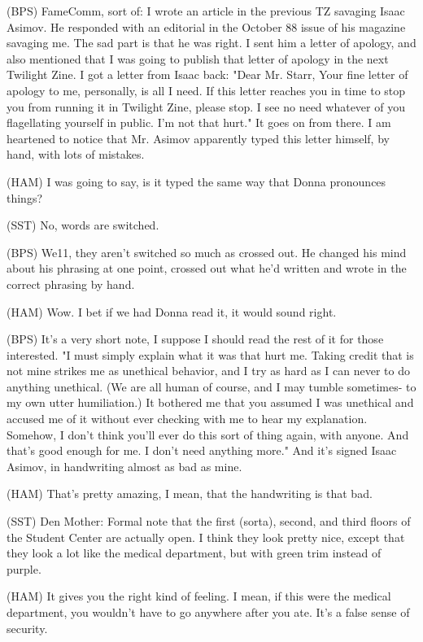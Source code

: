 \documentclass[12pt]{article}
\begin{document}
(BPS) FameComm, sort of: I wrote an article in the previous TZ savaging Isaac Asimov. He responded with an editorial in the October 88 issue of his magazine savaging me. The sad part is that he was right. I sent him a letter of apology, and also mentioned that I was going to publish that letter of apology in the next Twilight Zine. I got a letter from Isaac back: "Dear Mr. Starr, Your fine letter of apology to me, personally, is all I need. If this letter reaches you in time to stop you from running it in Twilight Zine, please stop. I see no need whatever of you flagellating yourself in public. I'm not that hurt." It goes on from there. I am heartened to notice that Mr. Asimov apparently typed this letter himself, by hand, with lots of mistakes.

(HAM) I was going to say, is it typed the same way that Donna pronounces things?

(SST) No, words are switched.

(BPS) We11, they aren't switched so much as crossed out. He changed his mind about his phrasing at one point, crossed out what he'd written and wrote in the correct phrasing by hand.

(HAM) Wow. I bet if we had Donna read it, it would sound right.

(BPS) It's a very short note, I suppose I should read the rest of it for those interested. "I must simply explain what it was that hurt me. Taking credit that is not mine strikes me as unethical behavior, and I try as hard as I can never to do anything unethical. (We are all human of course, and I may tumble sometimes- to my own utter humiliation.) It bothered me that you assumed I was unethical and accused me of it without ever checking with me to hear my explanation. Somehow, I don't think you'll ever do this sort of thing again, with anyone. And that's good enough for me. I don't need anything more." And it's signed Isaac Asimov, in handwriting almost as bad as mine.

(HAM) That's pretty amazing, I mean, that the handwriting is that bad.

(SST) Den Mother: Formal note that the first (sorta), second, and third floors of the Student Center are actually open. I think they look pretty nice, except that they look a lot like the medical department, but with green trim instead of purple.

(HAM) It gives you the right kind of feeling. I mean, if this were the medical department, you wouldn't have to go anywhere after you ate. It's a false sense of security.
\end{document}
